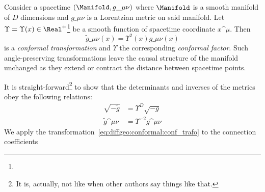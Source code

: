


\newcommand*\cfac{\Upsilon}   %




\begin{draft}

Consider a spacetime $(\Manifold, g\_{\mu\nu})$ where $\Manifold$ is a smooth manifold of $D$ dimensions and $g\_{\mu\nu}$ is a Lorentzian metric on said manifold. Let $\cfac= \cfac(x)\in \Real^+$\footnote{} be a smooth function of spacetime coordinate $x\^\mu$. Then
\begin{equation}\label{eq:diffgeo:conformal:conf_trafo}
    \tilde{g}\_{\mu\nu}(x ) = \cfac^2(x) g\_{\mu\nu}(x)
\end{equation}
is a \emph{conformal transformation} and $\cfac$ the corresponding \emph{conformal factor}. Such angle-preserving transformations leave the causal structure of the manifold unchanged as they extend or contract the distance between spacetime points. 


\blahblah

It is straight-forward\footnote{It is, actually, not like when other authors say things like that.} to show that the determinants and inverses of the metrics obey the following relations:
\begin{equation}
    \begin{split}
        \sqrt{-\tilde{g}}   &= \cfac^D \sqrt{-g} \\
        \tilde{g}\^{\mu\nu} &= \cfac^{-2} g\^{\mu\nu}
    \end{split}
\end{equation}
We apply the transformation~\cref{eq:diffgeo:conformal:conf_trafo} to the connection coefficients

\blahblah
{
\newcommand*\Chr{\ChristophelSym}
\newcommand*\Chrt{\ChristophelSym[\tilde{\Gamma}]}
\newcommand*\Kd{\Krondelta}
\newcommand*\Ri{\RicciScalar}



}
\end{draft}
